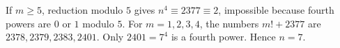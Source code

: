 If $m\ge5$, reduction modulo $5$ gives $n^4\equiv2377\equiv2$, impossible because fourth powers are $0$ or $1$ modulo $5$. For $m=1,2,3,4$, the numbers $m!+2377$ are $2378,2379,2383,2401$. Only $2401=7^4$ is a fourth power. Hence $\boxed{n=7}$.
